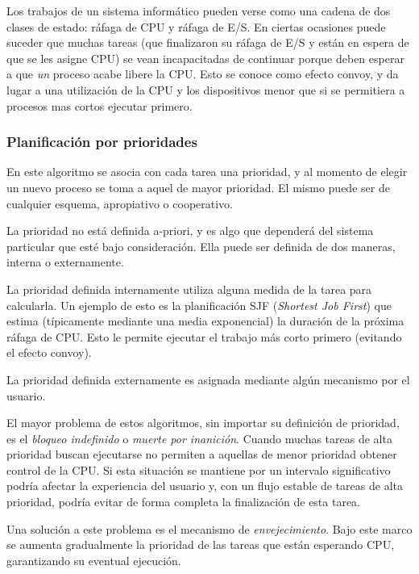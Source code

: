 Los trabajos de un sistema informático pueden verse como una cadena de dos clases de estado: ráfaga de CPU y ráfaga de E/S.
En ciertas ocasiones puede suceder que muchas tareas (que finalizaron su ráfaga de E/S y están en espera de que se les asigne CPU)
se vean incapacitadas de continuar porque deben esperar a que \emph{un} proceso acabe libere la CPU.
Esto se conoce como efecto convoy, y da lugar a una utilización de la CPU y los
   dispositivos menor que si se permitiera a procesos mas cortos ejecutar primero.

\subsubsection{Planificación por prioridades}

En este algoritmo se asocia con cada tarea una prioridad, y al momento de elegir un nuevo proceso se toma a aquel de mayor prioridad.
El mismo puede ser de cualquier esquema, apropiativo o cooperativo.

La prioridad no está definida a-priori, y es algo que dependerá del sistema particular que esté bajo consideración.
Ella puede ser definida de dos maneras, interna o externamente.

La prioridad definida internamente utiliza alguna medida de la tarea para calcularla.
Un ejemplo de esto es la planificación SJF (\emph{Shortest Job First}) que estima
(típicamente mediante una media exponencial) la duración de la próxima ráfaga de CPU.
Esto le permite ejecutar el trabajo más corto primero (evitando el efecto convoy).

La prioridad definida externamente es asignada mediante algún mecanismo por el usuario.

El mayor problema de estos algoritmos, sin importar su definición de prioridad, es el \emph{bloqueo indefinido} o \emph{muerte por inanición}\cite{silberschatz}.
Cuando muchas tareas de alta prioridad buscan ejecutarse no permiten a aquellas de menor prioridad obtener control de la CPU.
Si esta situación se mantiene por un intervalo significativo podría afectar la experiencia del usuario y,
con un flujo estable de tareas de alta prioridad, podría evitar de forma completa la finalización de esta tarea.

Una solución a este problema es el mecanismo de \emph{envejecimiento}.
Bajo este marco se aumenta gradualmente la prioridad de las tareas que están esperando CPU, garantizando su eventual ejecución.

